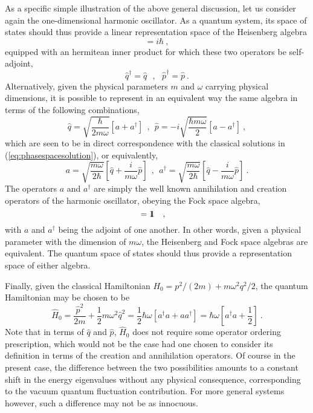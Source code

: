 \documentclass[a4paper,11pt]{article}
\def\one{1\hskip -.37em 1}
\begin{document}
As a specific simple illustration of the above general discussion,
let us consider again the one-dimensional harmonic oscillator.
As a quantum system, its space of states should thus provide a
linear representation space of the Heisenberg algebra
\begin{equation}[\,\hat{q},\hat{p}\,]=i\hbar\ ,
\label{eq:Heisenberg1.1}
\end{equation}
equipped with an hermitean inner product for which these two operators
be self-adjoint,
\begin{equation}
\hat{q}^\dagger=\hat{q}\ \ \ ,\ \ \ 
\hat{p}^\dagger=\hat{p}\ .
\label{eq:Heisenberg1.2}
\end{equation}
Alternatively, given the physical parameters $m$ and $\omega$
carrying physical dimensions,
it is possible to represent in an equivalent way the same algebra in
terms of the following combinations,
\begin{equation}
\hat{q}=\sqrt{\frac{\hbar}{2m\omega}}\left[a+a^\dagger\right]\ \ ,\ \ 
\hat{p}=-i\sqrt{\frac{\hbar m\omega}{2}}\left[a-a^\dagger\right]\ ,
\end{equation}
which are seen to be in direct correspondence with the classical
solutions in (\ref{eq:phasespacesolution}), or equivalently,
\begin{equation}
a=\sqrt{\frac{m\omega}{2\hbar}}\left[\hat{q}+\frac{i}{m\omega}\hat{p}\right]
\ \ ,\ \ 
a^\dagger=\sqrt{\frac{m\omega}{2\hbar}}\left[\hat{q}
-\frac{i}{m\omega}\hat{p}\right]\ .
\label{eq:definitionFock}
\end{equation}
The operators $a$ and $a^\dagger$ are simply the
well known annihilation and creation operators of the harmonic
oscillator, obeying the Fock space algebra,
\begin{equation}
[a,a^\dagger]=\one\ \ \ ,\ \ \
\label{eq:Fock}
\end{equation}
with $a$ and $a^\dagger$ being the adjoint of one another.
In other words, given a physical parameter with the dimension
of $m\omega$, the Heisenberg and Fock space algebras are equivalent.
The quantum space of states should thus provide a representation
space of either algebra.

Finally, given the classical Hamiltonian $H_0=p^2/(2m)+m\omega^2q^2/2$,
the quantum Hamiltonian may be chosen to be
\begin{equation}
\hat{H}_0=\frac{\hat{p}^2}{2m}+\frac{1}{2}m\omega^2\hat{q}^2=
\frac{1}{2}\hbar\omega[a^\dagger a+ a a^\dagger]=\hbar\omega
\left[a^\dagger a+\frac{1}{2}\right]\ .
\end{equation}
Note that in terms of $\hat{q}$ and $\hat{p}$, $\hat{H}_0$ does
not require some operator ordering prescription, which would not be
the case had one chosen to consider its definition in terms of
the creation and annihilation operators. Of course in the present
case, the difference between the two possibilities amounts to a
constant shift in the energy eigenvalues without any physical
consequence, corresponding to the vacuum quantum fluctuation
contribution. For more general systems however, such a difference may not
be as innocuous.
\end{document}
